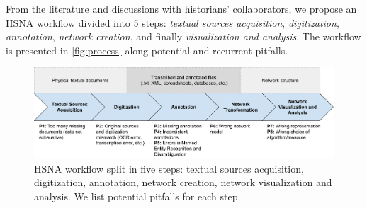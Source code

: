 From the literature and discussions with historians' collaborators, we propose an HSNA workflow divided into 5 steps: \textit{textual sources acquisition}, \textit{digitization}, \textit{annotation}, \textit{network creation}, and finally \textit{visualization and analysis}.
The workflow is presented in \autoref{fig:process} along potential and recurrent pitfalls.

\begin{figure}
    \includegraphics[origin=c, width=\textwidth]{static/figures/HSNAProcess/process.pdf}
 \caption{HSNA workflow split in five steps: textual sources acquisition, digitization, annotation, network creation, network visualization and analysis. We list potential pitfalls for each step.}
 \label{fig:process}
\end{figure}




